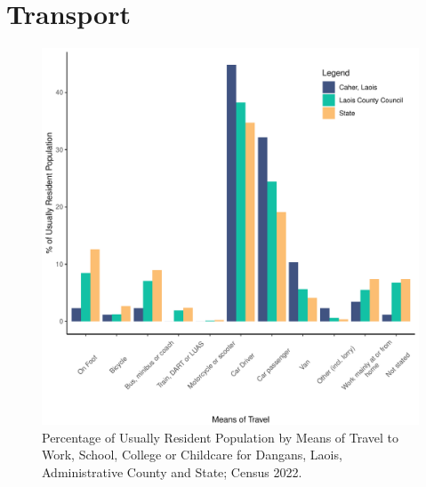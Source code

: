 \documentclass{article}
\begin{document}
\section{Transport}\label{sect:Trans}
\begin{figure}[H]
	\centering
	\includegraphics[width = 120mm]{../figures/TravelED.pdf}
	\caption{Percentage of Usually Resident Population by Means of Travel to Work, School, College or Childcare for Dangans, Laois, Administrative County and State; Census 2022.}
	\label{fig:vbnv}
	\end{figure}
\end{document}
